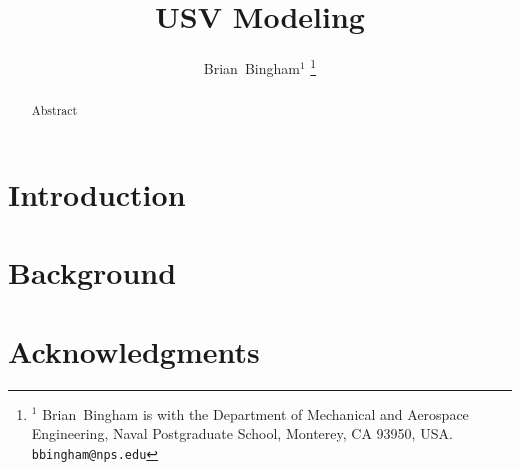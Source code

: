 \documentclass[11pt,draftcls,journal,onecolumn]{../latexlib/latex_ieee/IEEEtran}
\begin{document}
\newtheorem{remark}{Remark}
\renewcommand{\theremark}{\unskip}



%


\newcommand{\SF}{0.2}
\newcommand{\SFb}{0.45}
\newcommand{\SFPic}{0.45}
\newcommand{\SFPlot}{0.45}
\newcommand{\SFc}{0.25}
\newcommand{\FigWidth}{\SFb}

\newcommand{\scaleOneTwo}[2] {\scalebox{#1}}

\graphicspath{{./figs/}}

\title{USV Modeling}

\author{Brian~Bingham$^{1}$%
\thanks{$^{1}$ Brian~Bingham is with the Department of Mechanical and Aerospace Engineering, Naval Postgraduate School, Monterey, CA 93950, USA. {\tt\small bbingham@nps.edu}}%
}

\maketitle

\begin{abstract}
Abstract
\end{abstract}

\IEEEpeerreviewmaketitle

\section{Introduction}

\section{Background}


\section{Acknowledgments}



%


\end{document}
